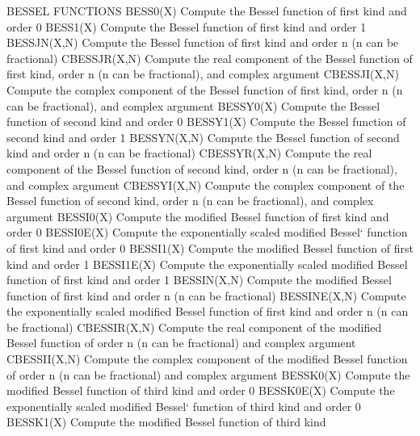BESSEL FUNCTIONS
   BESS0(X)       Compute the Bessel function of first kind and order 0
   BESS1(X)       Compute the Bessel function of first kind and order 1
   BESSJN(X,N)    Compute the Bessel function of first kind and order n
                  (n can be fractional)
   CBESSJR(X,N)   Compute the real component of the Bessel function of
                  first kind, order n (n can be fractional), and
                  complex argument
   CBESSJI(X,N)   Compute the complex component of the Bessel function
                  of first kind, order n (n can be fractional), and
                  complex argument
   BESSY0(X)      Compute the Bessel function of second kind and order
                  0
   BESSY1(X)      Compute the Bessel function of second kind and order
                  1
   BESSYN(X,N)    Compute the Bessel function of second kind and order
                  n (n can be fractional)
   CBESSYR(X,N)   Compute the real component of the Bessel function of
                  second kind, order n (n can be fractional), and
                  complex argument
   CBESSYI(X,N)   Compute the complex component of the Bessel function
                  of second kind, order n (n can be fractional), and
                  complex argument
   BESSI0(X)      Compute the modified Bessel function of first kind
                  and order 0
   BESSI0E(X)     Compute the exponentially scaled modified Bessel`
                  function of first kind and order 0
   BESSI1(X)      Compute the modified Bessel function of first kind
                  and order 1
   BESSI1E(X)     Compute the exponentially scaled modified Bessel
                  function of first kind and order 1
   BESSIN(X,N)    Compute the modified Bessel function of first kind
                  and order n (n can be fractional)
   BESSINE(X,N)   Compute the exponentially scaled modified Bessel
                  function of first kind and order n (n can be
                  fractional)
   CBESSIR(X,N)   Compute the real component of the modified Bessel
                  function of order n (n can be fractional) and
                  complex argument
   CBESSII(X,N)   Compute the complex component of the modified Bessel
                  function of order n (n can be fractional) and
                  complex argument
   BESSK0(X)      Compute the modified Bessel function of third kind
                  and order 0
   BESSK0E(X)     Compute the exponentially scaled modified Bessel`
                  function of third kind and order 0
   BESSK1(X)      Compute the modified Bessel function of third kind
